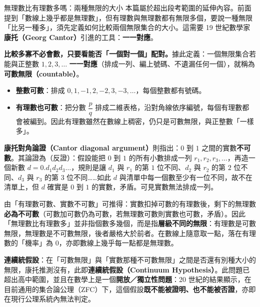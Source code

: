 \documentclass[11pt]{article}
\begin{document}
\begin{延伸框}{無理數比有理數多嗎：兩種無限的大小}
本篇屬於超出段考範圍的延伸內容。前面提到「數線上幾乎都是無理數」，但有理數與無理數都有無限多個，要說一種無限「比另一種多」，須先定義如何比較兩個無限集合的大小。這需要 19 世紀數學家\textbf{康托（Georg Cantor）}引進的工具：\textbf{一一對應}。

\textbf{比較多寡不必會數，只要看能否「一個對一個」配對。}據此定義：一個無限集合若能與正整數 $1,2,3,\ldots$ \textbf{一一對應}（排成一列、編上號碼、不遺漏任何一個），就稱為\textbf{可數無限（countable）}。

\begin{itemize}\setlength{\itemsep}{1pt}
\item \textbf{整數可數}：排成 $0,1,-1,2,-2,3,-3,\ldots$，每個整數都有號碼。
\item \textbf{有理數也可數}：把分數 $\dfrac pq$ 排成二維表格，沿對角線依序編號，每個有理數都會被編到。因此有理數雖然在數線上稠密，仍只是可數無限，與正整數「一樣多」。
\end{itemize}

\textbf{康托對角論證（Cantor diagonal argument）}則指出：$0$ 到 $1$ 之間的實數\textbf{不可數}。其論證為（反證）：假設能把 $0$ 到 $1$ 的所有小數排成一列 $r_1,r_2,r_3,\ldots$，再造一個新數 $d=0.d_1d_2d_3\ldots$，規則是讓 $d_1$ 與 $r_1$ 的第 $1$ 位不同、$d_2$ 與 $r_2$ 的第 $2$ 位不同、$d_3$ 與 $r_3$ 的第 $3$ 位不同……如此 $d$ 與清單中每一個數至少有一位不同，故不在清單上，但 $d$ 確實是 $0$ 到 $1$ 的實數，矛盾。可見實數無法排成一列。

由「有理數可數、實數不可數」可推得：實數扣掉可數的有理數後，剩下的無理數\textbf{必為不可數}（可數加可數仍為可數，若無理數可數則實數也可數，矛盾）。因此「無理數比有理數多」並非指個數多幾個，而是指\textbf{層級不同的無限}：有理數是可數無限，無理數是不可數無限，後者嚴格大於前者。在數線上隨意取一點，落在有理數的「機率」為 $0$，亦即數線上幾乎每一點都是無理數。

\textbf{連續統假設}：在「可數無限」與「實數那種不可數無限」之間是否還有別種大小的無限，康托推測沒有，此即\textbf{連續統假設（Continuum Hypothesis）}。此問題已超出高中範圍，並且在數學上是一個\textbf{開放／獨立性問題}：20 世紀的結果顯示，在目前通用的集合論公理（ZFC）下，這個假設\textbf{既不能被證明、也不能被否證}，亦即在現行公理系統內無法判定。
\end{延伸框}
\end{document}
